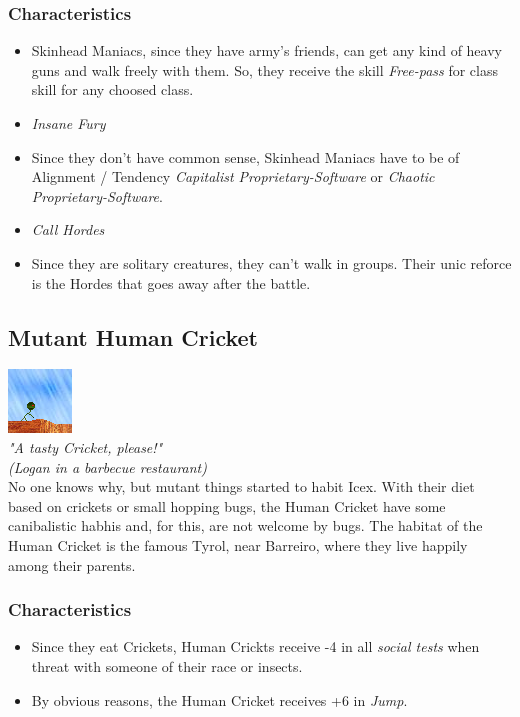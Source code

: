 \documentclass[ letterpaper,12pt]{article}
\begin{document}
\subsubsection{Characteristics}
\begin{itemize}
\item{Skinhead Maniacs, since they have army's friends, can get any kind of heavy guns and walk freely with them. So, they receive the skill {\it Free-pass} for class skill for any choosed class.}
\item{{\it Insane Fury}}
\item{Since they don't have common sense, Skinhead Maniacs have to be of Alignment / Tendency {\it Capitalist Proprietary-Software} or {\it Chaotic Proprietary-Software}.}
\item{{\it Call Hordes}}
\item{Since they are solitary creatures, they can't walk in groups. Their unic reforce is the Hordes that goes away after the battle.}
\end{itemize}

\subsection{Mutant Human Cricket}
\includegraphics{../data/races/Img/grilo.png}\\
{\it "A tasty Cricket, please!"\\
(Logan in a barbecue restaurant)}\\

No one knows why, but mutant things started to habit Icex. With their diet
based on crickets or small hopping bugs, the Human Cricket have some
canibalistic habhis and, for this, are not welcome by bugs. The habitat of the
Human Cricket is the famous Tyrol, near Barreiro, where they live happily
among their parents.

\subsubsection{Characteristics}
\begin{itemize}
\item{Since they eat Crickets, Human Crickts receive -4 in all {\it social tests} when threat with someone of their race or insects.}
\item{By obvious reasons, the Human Cricket receives +6 in {\it Jump}.}
\end{itemize}
\end{document}
